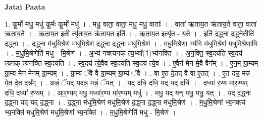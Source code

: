 \documentclass[17pt]{extarticle}
\begin{document}
\textbf{Jatai Paata} \newline

1. कू॒र्मो मधु॒ मधु॑ कू॒र्मः कू॒र्मो मधु॑ । . मधु॒ वाता॒ वाता॒ मधु॒ मधु॒ वाताः᳚ । . वाता॑ ऋताय॒त ऋ॑ताय॒ते वाता॒ वाता॑ ऋताय॒ते । . ऋ॒ता॒य॒त इती त्यृ॑ताय॒त ऋ॑ताय॒त इति॑ । . ऋ॒ता॒य॒त इत्यृ॑त - य॒ते । . इति॑ द॒द्ध्ना द॒द्ध्नेतीति॑ द॒द्ध्ना । . द॒द्ध्ना म॑धुमि॒श्रेण॑ मधुमि॒श्रेण॑ द॒द्ध्ना द॒द्ध्ना म॑धुमि॒श्रेण॑ । . म॒धु॒मि॒श्रेणा॒ भ्य॑भि म॑धुमि॒श्रेण॑ मधुमि॒श्रेणा॒भि । . म॒धु॒मि॒श्रेणेति॑ मधु - मि॒श्रेण॑ । . अ॒भ्य॑ नक्त्यनक् त्य॒भ्या᳚(1॒)भ्य॑नक्ति । . अ॒न॒क्ति॒ स्व॒दय॑ति स्व॒दय॑ त्यनक् त्यनक्ति स्व॒दय॑ति । . स्व॒दय॑ त्ये॒वैव स्व॒दय॑ति स्व॒दय॑ त्ये॒व । . ए॒वैन॑ मेन मे॒वै वैन᳚म् । . ए॒न॒म् ग्रा॒म्यम् ग्रा॒म्य मे॑न मेनम् ग्रा॒म्यम् । . ग्रा॒म्यं ॅवै वै ग्रा॒म्यम् ग्रा॒म्यं ॅवै । . वा ए॒त दे॒तद् वै वा ए॒तत् । . ए॒त दन्न॒ मन्न॑ मे॒त दे॒त दन्न᳚म् । . अन्नं॒ ॅयद् यदन्न॒ मन्नं॒ ॅयत् । . यद् दधि॒ दधि॒ यद् यद् दधि॑ । . दध्या॑ र॒ण्य मा॑र॒ण्यम् दधि॒ दध्या॑ र॒ण्यम् । . आ॒र॒ण्यम् मधु॒ मध्वा॑र॒ण्य मा॑र॒ण्यम् मधु॑ । . मधु॒ यद् यन् मधु॒ मधु॒ यत् । . यद् द॒द्ध्ना द॒द्ध्ना यद् यद् द॒द्ध्ना । . द॒द्ध्ना म॑धुमि॒श्रेण॑ मधुमि॒श्रेण॑ द॒द्ध्ना द॒द्ध्ना म॑धुमि॒श्रेण॑ । . म॒धु॒मि॒श्रेणा᳚ भ्य॒नक्त्य॑ भ्य॒नक्ति॑ मधुमि॒श्रेण॑ मधुमि॒श्रेणा᳚ भ्य॒नक्ति॑ । . म॒धु॒मि॒श्रेणेति॑ मधु - मि॒श्रेण॑ । \newline
\end{document}
